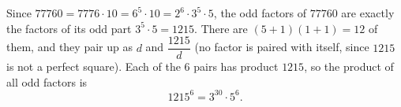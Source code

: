 Since $77760=7776\cdot10=6^5\cdot10=2^6\cdot3^5\cdot5$, the odd factors of $77760$ are exactly the factors of its odd part $3^5\cdot5=1215$. There are $(5+1)(1+1)=12$ of them, and they pair up as $d$ and $\dfrac{1215}{d}$ (no factor is paired with itself, since $1215$ is not a perfect square). Each of the $6$ pairs has product $1215$, so the product of all odd factors is
\[\boxed{1215^6}=3^{30}\cdot5^6 .\]
